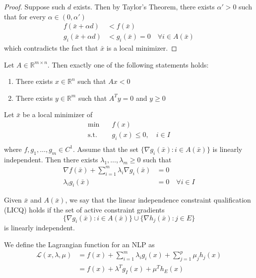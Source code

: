 \begin{proof}[Proof]
    Suppose such $d$ exists. Then by Taylor's Theorem, there exists $\alpha' > 0$ such that for every $\alpha \in (0, \alpha')$
    \begin{align*}
        f(\bar x + \alpha d) &< f(\bar x) \tag*{and} \\
        g_i(\bar x + \alpha d) &< g_i(\bar x) = 0 \quad \forall i \in A(\bar x) 
    \end{align*}
    which contradicts the fact that $\bar x$ is a local minimizer.
\end{proof}
\begin{lemma}
    Let $A \in \mathbb R^{m \times n}$. Then exactly one of the following statements holds:
    \begin{enumerate}
        \item There exists $x \in \mathbb R^n$ such that $Ax < 0$
        \item There exists $y \in \mathbb R^m$ such that $A^Ty = 0$ and $y \geq 0$
    \end{enumerate}
\end{lemma}
\begin{theorem}[]
    Let $\bar x$ be a local minimizer of 
    \begin{align*}
        \min \quad & f(x) \\
        \text{s.t.} \quad & g_i(x) \leq 0, \quad i \in I \\
    \end{align*}
    where $f, g_1,\ldots,g_m \in C^1$. Assume that the set $\{\nabla g_i(\bar x): i \in A(\bar x)\}$ is linearly independent. Then there exists $\lambda_1,\ldots,\lambda_m \geq 0$ such that
    \begin{align*}
        \nabla f(\bar x) + \sum^m_{i=1} \lambda_i \nabla g_i(\bar x) &= 0 \\
        \lambda_i g_i(\bar x) &= 0 \quad \forall i \in I
    \end{align*}
\end{theorem}
\begin{definition}[LICQ]
    Given $\bar x$ and $A(\bar x)$, we say that the linear independence constraint qualification (LICQ) holds if the set of active constraint gradients
    $$\{\nabla g_i(\bar x): i \in A(\bar x)\} \cup \{\nabla h_j(\bar x): j \in E\}$$ is linearly independent.
\end{definition}
\begin{definition}
    We define the Lagrangian function for an NLP as 
    \begin{align*}
        \mathcal L(x, \lambda, \mu) &= f(x) + \sum_{i=1}^m \lambda_i g_i(x) + \sum_{j=1}^p \mu_j h_j(x) \\
        &= f(x) + \lambda^T g_I(x) + \mu^T h_E(x)
    \end{align*}
\end{definition}
